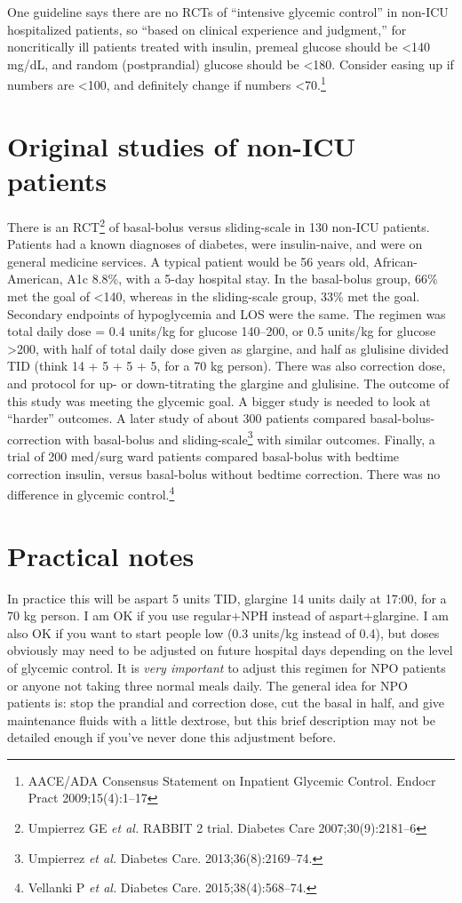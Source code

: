 \documentclass{tufte-handout}
\begin{document}
One guideline says there are no RCTs of ``intensive glycemic control''
in non-ICU hospitalized patients, so ``based on clinical experience
and judgment,'' for noncritically ill patients treated with insulin,
premeal glucose should be <140 mg/dL, and random (postprandial)
glucose should be <180. Consider easing up if numbers are <100, and
definitely change if numbers <70.\footnote{AACE/ADA Consensus
  Statement on Inpatient Glycemic Control. Endocr Pract
  2009;15(4):1--17}

\section{Original studies of non-ICU patients}

There is an RCT\footnote{Umpierrez GE \emph{et al.} RABBIT 2
  trial. Diabetes Care 2007;30(9):2181--6} of basal-bolus versus
sliding-scale in 130 non-ICU patients. Patients had a known diagnoses
of diabetes, were insulin-naive, and were on general medicine
services. A typical patient would be 56 years old, African-American,
A1c 8.8\%, with a 5-day hospital stay. In the basal-bolus group, 66\%
met the goal of <140, whereas in the sliding-scale group, 33\% met the
goal. Secondary endpoints of hypoglycemia and LOS were the same. The
regimen was total daily dose = 0.4 units/kg for glucose 140--200, or
0.5 units/kg for glucose >200, with half of total daily dose given as
glargine, and half as glulisine divided TID (think 14 + 5 + 5 + 5, for
a 70 kg person). There was also correction dose, and protocol for up-
or down-titrating the glargine and glulisine. The outcome of this
study was meeting the glycemic goal. A bigger study is needed to look
at ``harder'' outcomes. A later study of about 300 patients compared
basal-bolus-correction with basal-bolus and
sliding-scale\footnote{Umpierrez \emph{et al.}  Diabetes
  Care. 2013;36(8):2169--74.} with similar outcomes. Finally, a trial
of 200 med/surg ward patients compared basal-bolus with bedtime
correction insulin, versus basal-bolus without bedtime
correction. There was no difference in glycemic
control.\footnote{Vellanki P \emph{et al.} Diabetes
  Care. 2015;38(4):568--74.}

\section{Practical notes}

In practice this will be aspart 5 units TID, glargine 14 units daily
at 17:00, for a 70 kg person. I am OK if you use regular+NPH instead of
aspart+glargine. I am also OK if you want to start people low (0.3
units/kg instead of 0.4), but doses obviously may need to be adjusted
on future hospital days depending on the level of glycemic control. It
is \emph{very important} to adjust this regimen for NPO patients or
anyone not taking three normal meals daily. The general idea for NPO
patients is: stop the prandial and correction dose, cut the basal in
half, and give maintenance fluids with a little dextrose, but this
brief description may not be detailed enough if you've never done this
adjustment before.
\end{document}
